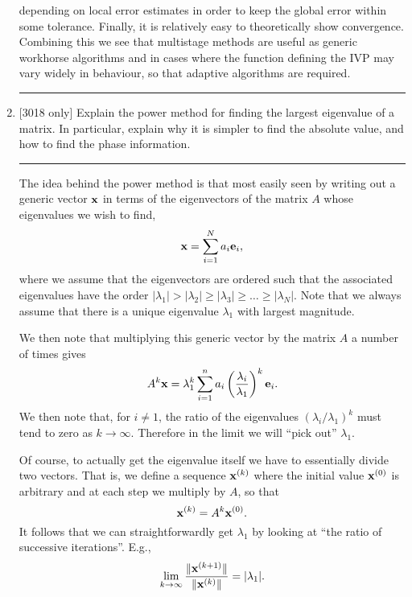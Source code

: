 \documentclass[10pt]{article}
\begin{document}
\begin{enumerate}
  depending on local error estimates in order to keep the global error
  within some tolerance. Finally, it is relatively easy to
  theoretically show convergence. Combining this we see that
  multistage methods are useful as generic workhorse algorithms and in
  cases where the function defining the IVP may vary widely in
  behaviour, so that adaptive algorithms are required.
  \begin{center}
    \rule{0.9\textwidth}{.1pt}
  \end{center}
\item{} [3018 only] Explain the power method for finding the largest
  eigenvalue of a matrix. In particular, explain why it is simpler to
  find the absolute value, and how to find the phase information.
  \begin{center}
    \rule{0.9\textwidth}{.1pt}
  \end{center}
  The idea behind the power method is that most easily seen by writing
  out a generic vector ${\bf x}$ in terms of the eigenvectors of the
  matrix $A$ whose eigenvalues we wish to find,
  \begin{equation*}
    {\bf x} = \sum_{i=1}^N a_i {\bf e}_i,
  \end{equation*}
  where we assume that the eigenvectors are ordered such that the
  associated eigenvalues have the order $|\lambda_1| > |\lambda_2| \ge
  |\lambda_3| \ge \dots \ge |\lambda_N|$. Note that we always assume
  that there is a unique eigenvalue $\lambda_1$ with largest
  magnitude. 

  We then note that multiplying this generic vector by the matrix $A$
  a number of times gives
  \begin{equation*}
    A^k {\bf x} = \lambda_1^k \sum_{i=1}^n a_i \left(
      \frac{\lambda_i}{\lambda_1} \right)^k {\bf e}_i.
  \end{equation*}
  We then note that, for $i \ne 1$, the ratio of the eigenvalues
  $(\lambda_i/\lambda_1)^k$ must tend to zero as $k \rightarrow
  \infty$. Therefore in the limit we will ``pick out'' $\lambda_1$. 

  Of course, to actually get the eigenvalue itself we have to
  essentially divide two vectors. That is, we define a sequence ${\bf
    x}^{(k)}$ where the initial value ${\bf x}^{(0)}$ is arbitrary and
  at each step we multiply by $A$, so that
  \begin{equation*}
    {\bf x}^{(k)} = A^k {\bf x}^{(0)}.
  \end{equation*}
  It follows that we can straightforwardly get $\lambda_1$ by looking
  at ``the ratio of successive iterations''. E.g.,
  \begin{equation*}
    \lim_{k \rightarrow \infty} \frac{\| {\bf x}^{(k+1)} \|}{\| {\bf
        x}^{(k)} \|} = | \lambda_1 |.
  \end{equation*}


\end{enumerate}
\end{document}
